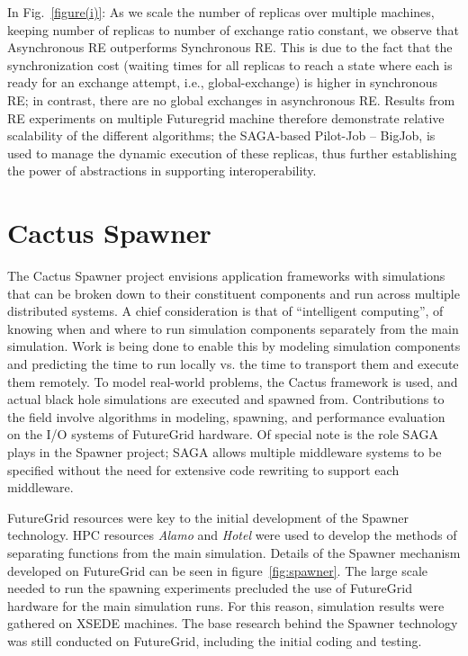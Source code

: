 \documentclass[]{paper}
\newcommand{\mrnote}[1]{ {\textcolor{cyan} { ***Melissa: #1 }}}
\newcommand{\mrnote}[1]{}
\begin{document}
In Fig.~\ref{figure(i)}: As we scale the number of replicas over multiple machines, keeping number of replicas to number of exchange ratio constant, we observe that Asynchronous RE outperforms Synchronous RE. This is due to the fact that the synchronization cost (waiting times for all replicas to reach a state where each is ready for an exchange attempt, i.e., global-exchange) is higher in synchronous RE; in contrast, there are no global exchanges in asynchronous RE.  Results from RE experiments on multiple Futuregrid machine therefore demonstrate relative scalability of the different algorithms; the SAGA-based Pilot-Job -- BigJob, is used to manage the dynamic execution of these replicas, thus further establishing the power of abstractions in supporting interoperability.


\section{Cactus Spawner}

The Cactus Spawner project envisions application frameworks with simulations that can be broken down to their constituent components and run across multiple distributed systems.  A chief consideration is that of ``intelligent computing'', of knowing when and where to run simulation components separately from the main simulation.  Work is being done to enable this by modeling simulation components and predicting the time to run locally vs. the time to transport them and execute them remotely.  To model real-world problems, the Cactus framework is used, and actual black hole simulations are executed and spawned from.  Contributions to the field involve algorithms in modeling, spawning, and performance evaluation on the I/O systems of FutureGrid hardware.  Of special note is the role SAGA plays in the Spawner project; SAGA allows multiple middleware systems to be specified without the need for extensive code rewriting to support each middleware.

FutureGrid resources were key to the initial development of the Spawner technology.  HPC resources \textit{Alamo} and \textit{Hotel} were used to develop the methods of separating functions from the main simulation. Details of the Spawner mechanism developed on FutureGrid can be seen in figure~\ref{fig:spawner}.  The large scale needed to run the spawning experiments precluded the use of FutureGrid hardware for the main simulation runs.  For this reason, simulation results were gathered on XSEDE machines.  The base research behind the Spawner technology was still conducted on FutureGrid, including the initial coding and testing.
\end{document}
